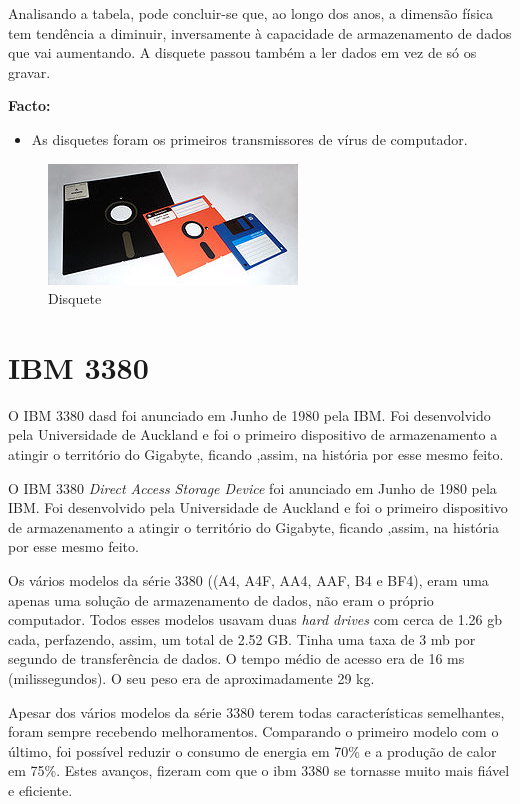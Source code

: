 \documentclass{report}
\begin{document}
	Analisando a tabela, pode concluir-se que, ao longo dos anos, a dimensão física tem tendência a diminuir, inversamente à capacidade de armazenamento de dados que vai aumentando. A disquete passou também a ler dados em vez de só os gravar. 

	\textbf{Facto:}	
		\begin{itemize}
		 	\item As disquetes foram os primeiros transmissores de vírus de computador. 
	 	\end{itemize}
	
	
	\begin{figure} [h]
		\centering
		\includegraphics[scale=1]{disquete.jpg}
		\caption{Disquete}
	\end{figure}
	
\newpage		
		
		\section{IBM 3380}	
	O IBM 3380 \ac{dasd} foi anunciado em Junho de 1980 pela IBM. Foi desenvolvido pela Universidade de Auckland e foi o primeiro dispositivo de armazenamento a atingir o território do Gigabyte, ficando ,assim, na história por esse mesmo feito.
		
	O IBM 3380 \textit{Direct Access Storage Device}  foi anunciado em Junho de 1980 pela IBM. Foi desenvolvido pela Universidade de Auckland e foi o primeiro dispositivo de armazenamento a atingir o território do Gigabyte, ficando ,assim, na história por esse mesmo feito.
\vspace{1mm}
	
	Os vários modelos da série 3380 ((A4, A4F, AA4, AAF, B4 e BF4), eram uma apenas uma solução de armazenamento de dados, não eram o próprio computador. Todos esses modelos usavam duas \textit{hard drives} com cerca de 1.26 \ac{gb} cada, perfazendo, assim, um total de 2.52 GB. Tinha uma taxa de 3 \ac{mb} por segundo de transferência de dados. O tempo médio de acesso era de 16 ms (milissegundos). O seu peso era de aproximadamente 29 kg. 
\vspace{1mm}

	
	Apesar dos vários modelos da série 3380 terem todas características semelhantes, foram sempre recebendo melhoramentos. Comparando o primeiro modelo com o último, foi possível reduzir o consumo de energia em 70\% e a produção de calor em 75\%. Estes avanços, fizeram com que o \ac{ibm} 3380 se tornasse muito mais fiável e eficiente.
\vspace{1mm}
\end{document}
